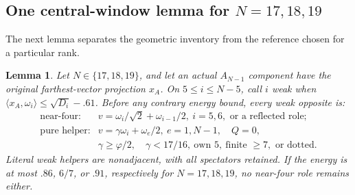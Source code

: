 \documentclass[11pt]{article}
\newtheorem{lemma}[theorem]{Lemma}
\theoremstyle{definition}
\theoremstyle{remark}
\newcommand{\ip}[2]{\langle #1,#2\rangle}
\begin{document}
\subsection[One central-window lemma for N=17,18,19]{One central-window lemma for \(N=17,18,19\)}
\label{app:Acentralwindow}
The next lemma separates the geometric inventory from the
reference chosen for a particular rank.
\begin{lemma}
Let \(N\in\{17,18,19\}\), and let an actual \(A_{N-1}\)
component have the original farthest-vector projection \(x_A\).
On \(5\leq i\leq N-5\), call \(i\) weak when
\(\ip{x_A}{\omega_i}\leq\sqrt{D_i}-.61\).
Before any contrary energy bound, every weak opposite is:
\[
\begin{array}{ll}
\text{near-four:}&v=\omega_i/\sqrt2+\omega_{i-1}/2,\
 i=5,6,\text{ or a reflected role};\\
\text{pure helper:}&v=\gamma\omega_i+\omega_e/2,\
 e=1,N-1,\quad Q=0,\\
 &\gamma\geq\varphi/2,\quad\gamma<17/16,\
 \text{own }5,\ \text{finite }\geq7,\text{ or dotted}.
\end{array}
\]
Literal weak helpers are nonadjacent, with all spectators
retained. If the energy is at most \(.86\), \(6/7\), or
\(.91\), respectively for \(N=17,18,19\), no near-four
role remains either.
\end{lemma}
\end{document}
